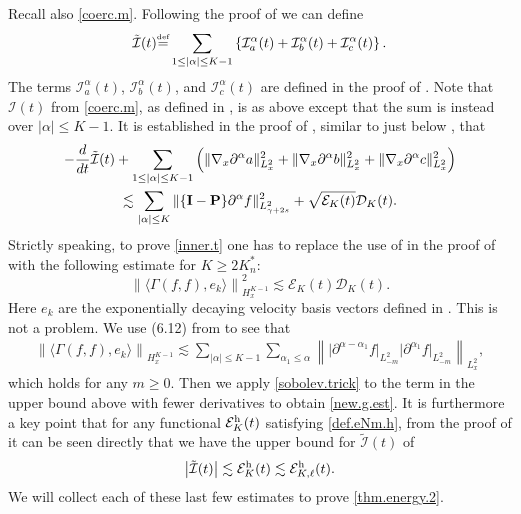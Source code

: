 \documentclass{amsart}
\numberwithin{equation}{section}
\begin{document}
Recall also \eqref{coerc.m}.  Following the proof of \cite[Theorem 8.4]{gsNonCut0} we can define
$$
\tilde{\mathcal{I}}(t) 
{\overset{\mbox{\tiny{def}}}{=}}
\sum_{1\le |\alpha|\le {K}-1}
\left\{
\mathcal{I}_a^\alpha(t)
+
\mathcal{I}_b^\alpha(t)
+
\mathcal{I}_c^\alpha(t)\right\}.
$$
The terms 
$\mathcal{I}_a^\alpha(t)$, $\mathcal{I}_b^\alpha(t)$, and $\mathcal{I}_c^\alpha(t)$ are defined in the proof of \cite[Theorem 8.4]{gsNonCut0}.  Note that $\mathcal{I}(t)$ from \eqref{coerc.m}, as defined in \cite[(8.25)]{gsNonCut0}, is as above except that the sum is instead over
$
|\alpha|\le {K}-1.
$
It is established in the proof of \cite[Theorem 8.4]{gsNonCut0}, similar to just below \cite[(8.25)]{gsNonCut0},  that
\begin{multline}
\label{inner.t}
-\frac{d}{dt} \tilde{\mathcal{I}}(t) 
+
\sum_{1\le |\alpha|\le {K}-1}
\left(
 \| \nabla_x  {\partial}^{\alpha} a \|^2_{L^2_x}
 +
\|\nabla_x {\partial}^{\alpha} b\|^2_{L^2_x}
+ \| \nabla_x  {\partial}^{\alpha} c \|^2_{L^2_x}
\right)
\\
\lesssim
\sum_{|\alpha| \le {K}}\|\{{\bf I-P}\} \partial^\alpha f\|^2_{L^2_{\gamma+2s}}
+
\sqrt{{\mathcal{E}}_{K}(t)}{\mathcal{D}}_{K}(t).
\end{multline}
Strictly speaking, to prove \eqref{inner.t} one has to replace the use of \cite[Lemma 8.7]{gsNonCut0} in the proof of 
\cite[Theorem 8.4]{gsNonCut0} with the following estimate for ${{K \ge 2{K^*_n}}}$:  
\begin{equation}
\left\| \langle \Gamma(f,f), {e}_k\rangle\right\|_{H^{K-1}_x}^2
\lesssim
{\mathcal{E}}_{K}(t){\mathcal{D}}_{K}(t).
\label{new.g.est}
\end{equation}
Here ${e}_k$ are the exponentially decaying velocity basis vectors defined in \cite[(8.10)]{gsNonCut0}.  This is not a problem.  We use (6.12) from \cite[Proposition 6.1]{gsNonCut0} to see that 
\begin{gather*}
\left\| \langle \Gamma(f,f), {e}_k\rangle\right\|_{H^{K-1}_x}
\lesssim
\sum_{|\alpha |\le K-1}\sum_{\alpha_1 \le \alpha}
\left\|
 {|} \partial^{\alpha - \alpha_1} f {|}_{L^2_{-m}} {|} \partial^{\alpha_1} f {|}_{L^2_{-m}} 
\right\|_{L^2_x},
\end{gather*}
which holds for any $m\ge 0$.  Then we apply \eqref{sobolev.trick} to the term in the upper bound above with fewer derivatives to obtain \eqref{new.g.est}.  It is furthermore a key point that for any functional ${\mathcal{E}}^{\rm h}_{K}(t)$ satisfying \eqref{def.eNm.h}, from the proof of  \cite[Theorem 8.4]{gsNonCut0} it can be seen directly that we have the upper bound for $\tilde{\mathcal{I}}(t)$ of
\begin{equation}
\left| \tilde{\mathcal{I}}(t)  \right| \lesssim {\mathcal{E}}^{\rm h}_{K}(t)\lesssim {\mathcal{E}}^{\rm h}_{{K},{\ell}}(t).
\label{key.inter.est}
\end{equation}
We will collect each of these last few estimates to prove \eqref{thm.energy.2}.
\end{document}
